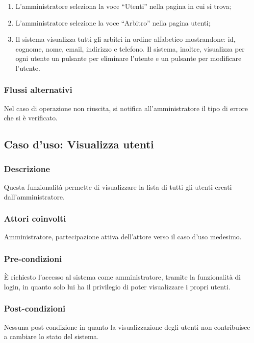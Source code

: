\begin{enumerate}
	
	\item
	L'amministratore seleziona la voce ``Utenti'' nella pagina in cui si trova;
	
	\item
	L'amministratore selezione la voce ``Arbitro'' nella pagina utenti;
	
	\item
	Il sistema visualizza tutti gli arbitri in ordine alfabetico mostrandone: id, cognome, nome, email, indirizzo e telefono. Il sistema, inoltre, visualizza per ogni utente un pulsante per eliminare l'utente e un pulsante per modificare l'utente.
	
\end{enumerate}

\subsubsection*{Flussi alternativi}
Nel caso di operazione non riuscita, si notifica all'amministratore il tipo di errore che si è verificato.


%
%
\subsection{Caso d'uso: Visualizza utenti}
\label{uc-visualizza-utenti}

\subsubsection*{Descrizione}
Questa funzionalità permette di visualizzare la lista di tutti gli utenti creati dall'amministratore.

\subsubsection*{Attori coinvolti}
Amministratore, partecipazione attiva dell'attore verso il caso d'uso medesimo.

\subsubsection*{Pre-condizioni}
È richiesto l'accesso al sistema come amministratore, tramite la funzionalità di login, in quanto solo lui ha il privilegio di poter visualizzare i propri utenti.

\subsubsection*{Post-condizioni}
Nessuna post-condizione in quanto la visualizzazione degli utenti non contribuisce a cambiare lo stato del sistema.


